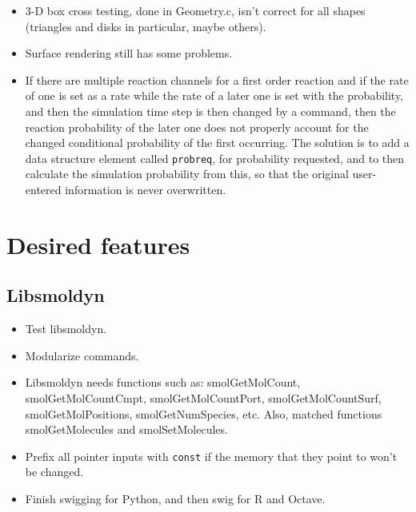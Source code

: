 \documentclass {scrbook}
\newcommand {\ttt} {\texttt}
\begin{document}
\begin{itemize}
\item 3-D box cross testing, done in Geometry.c, isn't correct for all shapes (triangles and disks in particular, maybe others).
\item Surface rendering still has some problems.
\item If there are multiple reaction channels for a first order reaction and if the rate of one is set as a rate while the rate of a later one is set with the probability, and then the simulation time step is then changed by a command, then the reaction probability of the later one does not properly account for the changed conditional probability of the first occurring. The solution is to add a data structure element called \ttt{probreq}, for probability requested, and to then calculate the simulation probability from this, so that the original user-entered information is never overwritten.
\end{itemize}

\section{Desired features}

\subsection{Libsmoldyn}
\begin{itemize}
\item Test libsmoldyn.
\item Modularize commands.
\item Libsmoldyn needs functions such as: smolGetMolCount, smolGetMolCountCmpt, smolGetMolCountPort, smolGetMolCountSurf, smolGetMolPositions, smolGetNumSpecies, etc. Also, matched functions smolGetMolecules and smolSetMolecules.
\item Prefix all pointer inputs with \ttt{const} if the memory that they point to won't be changed.
\item Finish swigging for Python, and then swig for R and Octave.
\end{itemize}
\end{document}
